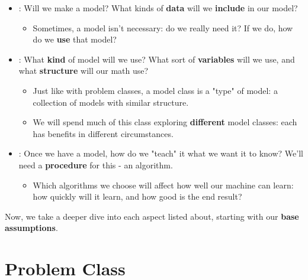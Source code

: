         \begin{itemize}
            \item {}: Will we make a model? What kinds of \textbf{data} will we \textbf{include} in our model?
            
                \begin{itemize}
                    \item Sometimes, a model isn't necessary: do we really need it? If we do, how do we \textbf{use} that model?
                \end{itemize}
            
            \item {}: What \textbf{kind} of model will we use? What sort of \textbf{variables} will we use, and what \textbf{structure} will our math use? 
                
                \begin{itemize}
                    \item Just like with problem classes, a model class is a "type" of model: a collection of models with similar structure.
                    \item We will spend much of this class exploring \textbf{different} model classes: each has benefits in different circumstances.
                \end{itemize}
                
            \item {}: Once we have a model, how do we "teach" it what we want it to know? We'll need a \textbf{procedure} for this - an algorithm.
                
                \begin{itemize}
                    \item Which algorithms we choose will affect how well our machine can learn: how quickly will it learn, and how good is the end result?
                \end{itemize}
        \end{itemize}
        
        Now, we take a deeper dive into each aspect listed about, starting with our \textbf{base assumptions}.

\pagebreak



\section{Problem Class}

